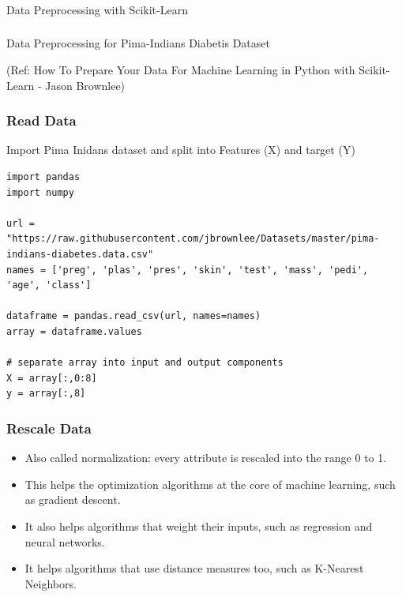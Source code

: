 \begin{frame}[fragile]\frametitle{}
\begin{center}
{\Large Data Preprocessing with Scikit-Learn}
\end{center}
\end{frame}

\begin{frame}[fragile]\frametitle{}
\begin{center}
{\Large Data Preprocessing for Pima-Indians Diabetis Dataset}

{\tiny (Ref: How To Prepare Your Data For Machine Learning in Python with Scikit-Learn - Jason Brownlee)}
\end{center}
\end{frame}

\begin{frame}[fragile]\frametitle{Read Data}
Import Pima Inidans dataset and split into Features (X) and target (Y)
\begin{lstlisting}
import pandas
import numpy

url = "https://raw.githubusercontent.com/jbrownlee/Datasets/master/pima-indians-diabetes.data.csv"
names = ['preg', 'plas', 'pres', 'skin', 'test', 'mass', 'pedi', 'age', 'class']

dataframe = pandas.read_csv(url, names=names)
array = dataframe.values

# separate array into input and output components
X = array[:,0:8]
y = array[:,8]
\end{lstlisting}
\end{frame}

\begin{frame}[fragile]\frametitle{Rescale Data}

	\begin{itemize}
	\item Also called normalization: every attribute is rescaled into the range 0 to 1.
	\item This helps the optimization algorithms at the core of machine learning, such as gradient descent.
	\item It also helps algorithms that weight their inputs, such as regression and neural networks.
	\item It helps algorithms that use distance measures too, such as K-Nearest Neighbors.
	\end{itemize}

\end{frame}

